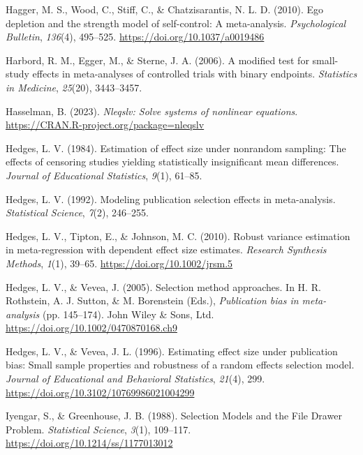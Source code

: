 \documentclass[
  man, donotrepeattitle,floatsintext]{apa7}
\newlength{\cslhangindent}
\newenvironment{CSLReferences}[2] %
 {\begin{list}{}{%
  \setlength{\itemindent}{0pt}
  \setlength{\leftmargin}{0pt}
  \setlength{\parsep}{0pt}
  \ifodd #1
   \setlength{\leftmargin}{\cslhangindent}
   \setlength{\itemindent}{-1\cslhangindent}
  \fi
  \setlength{\itemsep}{#2\baselineskip}}}
 {\end{list}}
\begin{document}
\begin{CSLReferences}{1}{0}
Hagger, M. S., Wood, C., Stiff, C., \& Chatzisarantis, N. L. D. (2010). Ego depletion and the strength model of self-control: {A} meta-analysis. \emph{Psychological Bulletin}, \emph{136}(4), 495--525. \url{https://doi.org/10.1037/a0019486}

Harbord, R. M., Egger, M., \& Sterne, J. A. (2006). A modified test for small-study effects in meta-analyses of controlled trials with binary endpoints. \emph{Statistics in Medicine}, \emph{25}(20), 3443--3457.

Hasselman, B. (2023). \emph{Nleqslv: Solve systems of nonlinear equations}. \url{https://CRAN.R-project.org/package=nleqslv}

Hedges, L. V. (1984). Estimation of effect size under nonrandom sampling: The effects of censoring studies yielding statistically insignificant mean differences. \emph{Journal of Educational Statistics}, \emph{9}(1), 61--85.

Hedges, L. V. (1992). Modeling publication selection effects in meta-analysis. \emph{Statistical Science}, \emph{7}(2), 246--255.

Hedges, L. V., Tipton, E., \& Johnson, M. C. (2010). {Robust variance estimation in meta-regression with dependent effect size estimates}. \emph{Research Synthesis Methods}, \emph{1}(1), 39--65. \url{https://doi.org/10.1002/jrsm.5}

Hedges, L. V., \& Vevea, J. (2005). Selection method approaches. In H. R. Rothstein, A. J. Sutton, \& M. Borenstein (Eds.), \emph{Publication bias in meta-analysis} (pp. 145--174). {John Wiley \& Sons, Ltd}. \url{https://doi.org/10.1002/0470870168.ch9}

Hedges, L. V., \& Vevea, J. L. (1996). {Estimating effect size under publication bias: Small sample properties and robustness of a random effects selection model}. \emph{Journal of Educational and Behavioral Statistics}, \emph{21}(4), 299. \url{https://doi.org/10.3102/10769986021004299}

Iyengar, S., \& Greenhouse, J. B. (1988). Selection {Models} and the {File} {Drawer} {Problem}. \emph{Statistical Science}, \emph{3}(1), 109--117. \url{https://doi.org/10.1214/ss/1177013012}


\end{CSLReferences}
\end{document}
